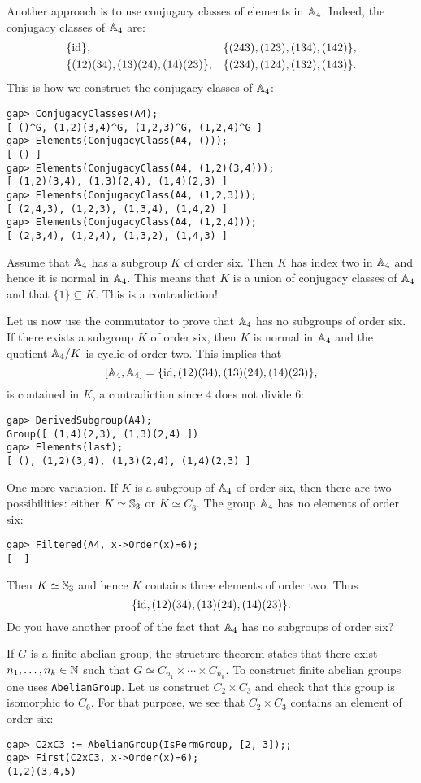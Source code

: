\begin{example}
Another approach is to use conjugacy classes of elements in $\mathbb{A}_4$. Indeed, the conjugacy classes of $\mathbb{A}_4$ are:
\begin{align*}
	&\{\operatorname{id}\},
	&&\{(243), (123), (134), (142)\},\\
	&\{(12)(34),(13)(24),(14)(23)\},
	&&\{(234),(124), (132), (143)\}.
\end{align*}
This is how we construct the conjugacy classes of $\mathbb{A}_4$:
\begin{lstlisting}
gap> ConjugacyClasses(A4);
[ ()^G, (1,2)(3,4)^G, (1,2,3)^G, (1,2,4)^G ]
gap> Elements(ConjugacyClass(A4, ()));
[ () ]
gap> Elements(ConjugacyClass(A4, (1,2)(3,4)));
[ (1,2)(3,4), (1,3)(2,4), (1,4)(2,3) ]
gap> Elements(ConjugacyClass(A4, (1,2,3)));
[ (2,4,3), (1,2,3), (1,3,4), (1,4,2) ]
gap> Elements(ConjugacyClass(A4, (1,2,4)));
[ (2,3,4), (1,2,4), (1,3,2), (1,4,3) ]
\end{lstlisting}
Assume that $\mathbb{A}_4$ has a subgroup $K$ of order six. Then $K$ has index two in
$\mathbb{A}_4$ and hence it is normal in $\mathbb{A}_4$.  This means that $K$ is a union of
conjugacy classes of $\mathbb{A}_4$ and that $\{1\}\subseteq K$. This is a
contradiction!

Let us now use the commutator to prove that $\mathbb{A}_4$ has no subgroups of order
six.  If there exists a subgroup $K$ of order six, then $K$ is normal in
$\mathbb{A}_4$ and the quotient $\mathbb{A}_4/K$ is cyclic of order two.  This implies that 
\[
[\mathbb{A}_4,\mathbb{A}_4]=\{\operatorname{id},(12)(34),(13)(24),(14)(23)\},
\]
is contained in $K$, a contradiction since $4$ does not divide $6$: 
\begin{lstlisting}
gap> DerivedSubgroup(A4);
Group([ (1,4)(2,3), (1,3)(2,4) ])
gap> Elements(last);
[ (), (1,2)(3,4), (1,3)(2,4), (1,4)(2,3) ]
\end{lstlisting}

One more variation. If $K$ is a subgroup of $\mathbb{A}_4$ of order six, then there
are two possibilities: either $K\simeq\mathbb{S}_3$ or $K\simeq C_6$. The
group $\mathbb{A}_4$ has no elements of order six:
\begin{lstlisting}
gap> Filtered(A4, x->Order(x)=6);
[  ]
\end{lstlisting}
Then $K\simeq\mathbb{S}_3$ and hence $K$ contains three elements of order two. Thus 
\[
	\{\operatorname{id},(12)(34),(13)(24),(14)(23)\}.
\]
Do you have another proof of the fact that $\mathbb{A}_4$ has no subgroups of order six?
\end{example}

\begin{example}
If $G$ is a finite abelian group, the structure theorem states that there exist
$n_1,\dots,n_k\in\mathbb{N}$ such that $G\simeq C_{n_1}\times\cdots\times C_{n_k}$.  To
construct finite abelian groups one uses \lstinline{AbelianGroup}. 
Let us construct $C_2\times C_3$ and check that this group is isomorphic to
$C_6$. For that purpose, we see that $C_2\times C_3$ contains an element of
order six:
\begin{lstlisting}
gap> C2xC3 := AbelianGroup(IsPermGroup, [2, 3]);;
gap> First(C2xC3, x->Order(x)=6);
(1,2)(3,4,5)
\end{lstlisting}
\end{example}

